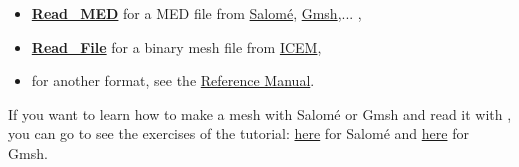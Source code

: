 \begin{itemize}
\item \href{TRUST_Reference_Manual.pdf\#readmed}{\textbf{Read\_MED}} for a MED file from \href{http://www.salome-platform.org}{Salom\'e}, \href{http://gmsh.info/}{Gmsh},... ,
\item \href{TRUST_Reference_Manual.pdf\#readfile}{\textbf{Read\_File}} for a binary mesh file from \href{http://resource.ansys.com/Products/Other+Products/ANSYS+ICEM+CFD}{ICEM},
\item for another format, see the \href{TRUST_Reference_Manual.pdf\#read}{\trust Reference Manual}.
\end{itemize}

If you want to learn how to make a mesh with Salom\'e or Gmsh and read it with \trust, you can go to see the exercises of the \trust tutorial: \href{TRUST_tutorial.pdf\#salome}{here} for Salom\'e and \href{TRUST_tutorial.pdf\#gmsh}{here} for Gmsh.




